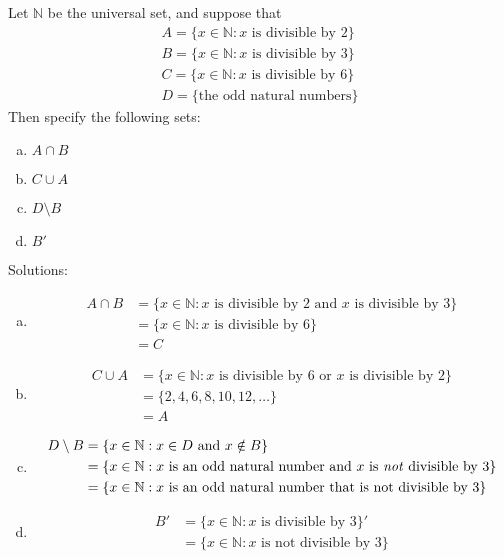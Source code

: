 \begin{example}\label{example:sets:operations}
Let ${\mathbb N}$ be the universal set, and suppose that
\begin{align*}
A = \{ x \in {\mathbb N} : x \text{ is divisible by 2}\} \\ 
B = \{ x \in {\mathbb N} : x \text{ is divisible by 3}\} \\ 
C = \{ x \in {\mathbb N} : x \text{ is divisible by 6}\} \\
D = \{\text{the odd natural numbers}\}
\end{align*} 
Then specify the following sets:
\begin{enumerate}[(a)]
\item 
$A \cap B$
\item
$C \cup A$
\item
 $D \setminus B$
\item
$B'$
\end{enumerate}

\noindent
Solutions:
\begin{enumerate}[(a)]
\item
\begin{align*}
A \cap B &= \{ x \in {\mathbb N} : x \text{ is divisible by 2} \text{ and } x \text{ is divisible by 3}\} \\
& = \{ x \in {\mathbb N} : x \text{ is divisible by 6}\} \\
& = C
\end{align*}
\item
\begin{align*}
C \cup A &= \{ x \in {\mathbb N} : x \text{ is divisible by 6} \text{ or } x \text{ is divisible by 2}\} \\
&= \{2, 4, 6, 8, 10, 12, \ldots \} \\
&= A
\end{align*}
\item
\begin{align*}
D \setminus B &= \{ x \in {\mathbb N} : x \in D \text{ and } x \notin B \} \\
&= \{ x \in {\mathbb N} : x \text{ is an odd natural number} \text{ and } x \text{ is \emph{not} divisible by 3} \} \\
&= \{  x \in {\mathbb N} : x \text{ is an odd natural number that is not divisible by 3} \} 
\end{align*} 
\item
\begin{align*}
B' &= \{ x \in {\mathbb N} : x \text{ is divisible by 3}\}' \\
&= \{ x \in {\mathbb N} : x \text{ is not divisible by 3}\}
\end{align*}
\end{enumerate} 
\end{example}

